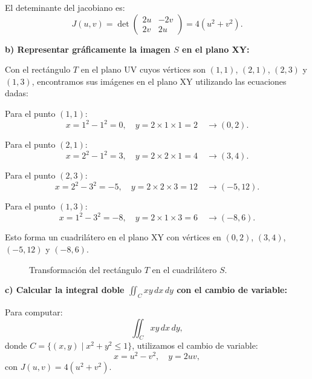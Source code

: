 \documentclass{report}
\begin{document}
El deteminante del jacobiano es:
\[
J(u,v) = \det\begin{pmatrix} 
2u & -2v \\
2v & 2u
\end{pmatrix}
= 4(u^2 + v^2).
\]

\textbf{b) Representar gráficamente la imagen $S$ en el plano XY:}

Con el rectángulo $T$ en el plano UV cuyos vértices son $(1,1)$, $(2,1)$, $(2,3)$ y $(1,3)$, encontramos sus imágenes en el plano XY utilizando las ecuaciones dadas:

Para el punto $(1,1)$:
\[
x = 1^2 - 1^2 = 0, \quad y = 2 \times 1 \times 1 = 2 \quad \longrightarrow (0,2).
\]

Para el punto $(2,1)$:
\[
x = 2^2 - 1^2 = 3, \quad y = 2 \times 2 \times 1 = 4 \quad \longrightarrow (3,4).
\]

Para el punto $(2,3)$:
\[
x = 2^2 - 3^2 = -5, \quad y = 2 \times 2 \times 3 = 12 \quad \longrightarrow (-5,12).
\]

Para el punto $(1,3)$:
\[
x = 1^2 - 3^2 = -8, \quad y = 2 \times 1 \times 3 = 6 \quad \longrightarrow (-8,6).
\]

Esto forma un cuadrilátero en el plano XY con vértices en $(0,2)$, $(3,4)$, $(-5,12)$ y $(-8,6)$.

\begin{figure}[h!]
    \centering
    \caption{Transformación del rectángulo $T$ en el cuadrilátero $S$.}
\end{figure}

\textbf{c) Calcular la integral doble $\iint_{C} x y \, dx \, dy$ con el cambio de variable:}

Para computar:
\[
\iint_{C} x y \, dx \, dy,
\]
donde $C = \{(x,y) \mid x^2 + y^2 \leq 1 \}$, utilizamos el cambio de variable:
\[
x = u^2 - v^2, \quad y = 2uv,
\]
con $J(u,v) = 4(u^2 + v^2)$.
\end{document}

